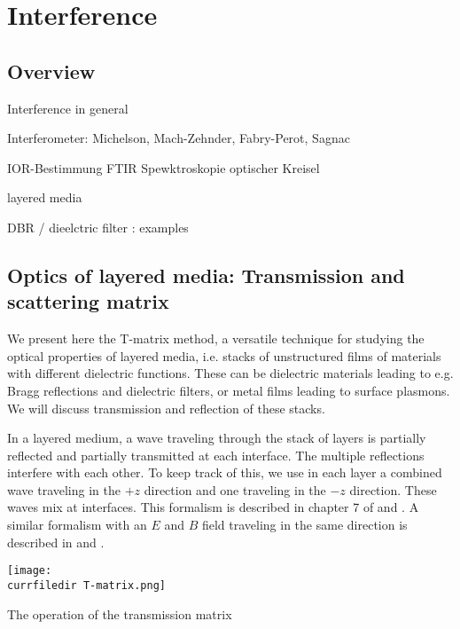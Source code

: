 \renewcommand{\lastmod}{December 18, 2023}
\renewcommand{\chapterauthors}{Markus Lippitz}

\chapter{Interference}

\section{Overview}


Interference in general

Interferometer: Michelson, Mach-Zehnder, Fabry-Perot, Sagnac

IOR-Bestimmung
FTIR Spewktroskopie
optischer Kreisel


layered media


DBR / dieelctric filter : examples





\section{Optics of layered media: Transmission and scattering matrix}
We present here the T-matrix method, a versatile technique for studying the optical properties of layered media, i.e. stacks of unstructured films of materials with different dielectric functions. These can be dielectric materials leading to e.g. Bragg reflections and dielectric filters, or metal films leading to surface plasmons. We will discuss transmission and reflection of these stacks.

In a layered medium, a wave traveling through the stack of layers is partially reflected and partially transmitted at each interface. The multiple reflections interfere with each other. To keep track of this, we use in each layer a combined wave traveling in the $+z$ direction and one traveling in the $-z$ direction. These waves mix at interfaces. This formalism is described in chapter 7 of \cite{SalehTeich1991} and \cite{Yeh2005}. A similar formalism with an $E$ and $B$ field traveling in the same direction is described in \cite{Pedrotti2008} and \cite{Macleod2001}.

\begin{marginfigure}
\texttt{[image: \\currfiledir T-matrix.png]}

\caption{The operation of the transmission matrix
\label{fig:6_T_matrix}}
\end{marginfigure}

